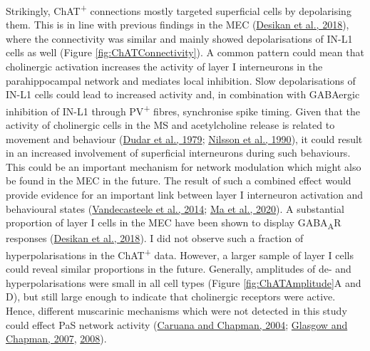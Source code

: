 \documentclass[
  12pt,
  a4paper,
  openany]{book}
\begin{document}
Strikingly, ChAT\textsuperscript{+} connections mostly targeted superficial cells by depolarising them. This is in line with previous findings in the MEC (\protect\hyperlink{ref-desikan_target_2018}{Desikan et al., 2018}), where the connectivity was similar and mainly showed depolarisations of IN-L1 cells as well (Figure \ref{fig:ChATConnectivity}). A common pattern could mean that cholinergic activation increases the activity of layer I interneurons in the parahippocampal network and mediates local inhibition. Slow depolarisations of IN-L1 cells could lead to increased activity and, in combination with GABAergic inhibition of IN-L1 through PV\textsuperscript{+} fibres, synchronise spike timing. Given that the activity of cholinergic cells in the MS and acetylcholine release is related to movement and behaviour (\protect\hyperlink{ref-dudar_release_1979}{Dudar et al., 1979}; \protect\hyperlink{ref-nilsson_acetylcholine_1990}{Nilsson et al., 1990}), it could result in an increased involvement of superficial interneurons during such behaviours. This could be an important mechanism for network modulation which might also be found in the MEC in the future. The result of such a combined effect would provide evidence for an important link between layer I interneuron activation and behavioural states (\protect\hyperlink{ref-vandecasteele_optogenetic_2014}{Vandecasteele et al., 2014}; \protect\hyperlink{ref-ma_firing_2020}{Ma et al., 2020}). A substantial proportion of layer I cells in the MEC have been shown to display GABA\textsubscript{A}R responses (\protect\hyperlink{ref-desikan_target_2018}{Desikan et al., 2018}). I did not observe such a fraction of hyperpolarisations in the ChAT\textsuperscript{+} data. However, a larger sample of layer I cells could reveal similar proportions in the future. Generally, amplitudes of de- and hyperpolarisations were small in all cell types (Figure \ref{fig:ChATAmplitude}A and D), but still large enough to indicate that cholinergic receptors were active. Hence, different muscarinic mechanisms which were not detected in this study could effect PaS network activity (\protect\hyperlink{ref-caruana_stimulation_2004}{Caruana and Chapman, 2004}; \protect\hyperlink{ref-glasgow_local_2007}{Glasgow and Chapman, 2007}, \protect\hyperlink{ref-glasgow_conductances_2008}{2008}).
\end{document}
